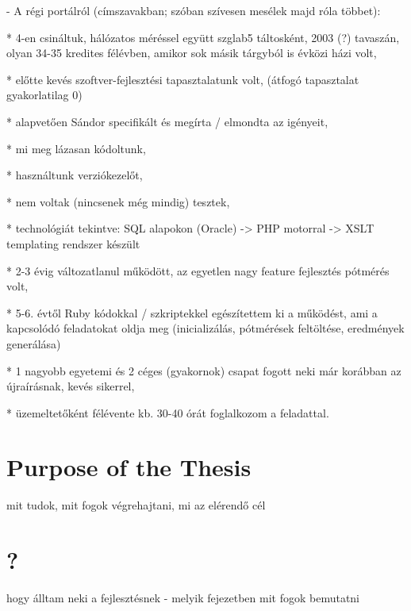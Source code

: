 
- A régi portálról (címszavakban; szóban szívesen mesélek majd róla többet):

* 4-en csináltuk, hálózatos méréssel együtt szglab5 táltosként, 2003
(?) tavaszán, olyan 34-35 kredites félévben, amikor sok másik tárgyból
is évközi házi volt,

* előtte kevés szoftver-fejlesztési tapasztalatunk volt, (átfogó
tapasztalat gyakorlatilag 0)

* alapvetően Sándor specifikált és megírta / elmondta az igényeit,

* mi meg lázasan kódoltunk,

* használtunk verziókezelőt,

* nem voltak (nincsenek még mindig) tesztek,

* technológiát tekintve: SQL alapokon (Oracle) -> PHP motorral -> XSLT
templating rendszer készült

* 2-3 évig változatlanul működött, az egyetlen nagy feature fejlesztés
pótmérés volt,

* 5-6. évtől Ruby kódokkal / szkriptekkel egészítettem ki a működést,
ami a kapcsolódó feladatokat oldja meg (inicializálás, pótmérések
feltöltése, eredmények generálása)

* 1 nagyobb egyetemi és 2 céges (gyakornok) csapat fogott neki már
korábban az újraírásnak, kevés sikerrel,

* üzemeltetőként félévente kb. 30-40 órát foglalkozom a feladattal.

\section{Purpose of the Thesis}
mit tudok, mit fogok végrehajtani, mi az elérendő cél

\section{?}
hogy álltam neki a fejlesztésnek - melyik fejezetben mit fogok bemutatni